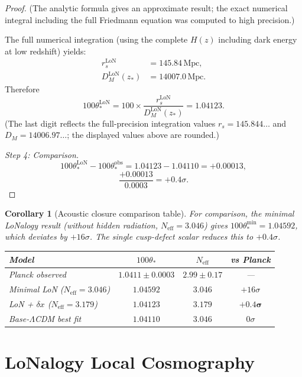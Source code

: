 \documentclass[12pt]{article}
\theoremstyle{plain}
\newtheorem{corollary}[theorem]{Corollary}
\theoremstyle{definition}
\numberwithin{equation}{section}
\newcommand{\eff}{\mathrm{eff}}
\newcommand{\obs}{\mathrm{obs}}
\newcommand{\LoN}{\mathrm{LoN}}
\begin{document}
\begin{proof}
(The analytic formula gives an approximate result; the exact numerical
integral including the full Friedmann equation was computed to high precision.)

The full numerical integration (using the complete $H(z)$ including dark
energy at low redshift) yields:
\begin{align}
r_s^{\LoN} &= 145.84\,\mathrm{Mpc},\\
D_M^{\LoN}(z_*) &= 14007.0\,\mathrm{Mpc}.
\end{align}
Therefore
\begin{equation}
100\theta_*^{\LoN} = 100\times\frac{r_s^{\LoN}}{D_M^{\LoN}(z_*)} = 1.04123.
\end{equation}
(The last digit reflects the full-precision integration values
$r_s=145.844\ldots$ and $D_M=14006.97\ldots$; the displayed values
above are rounded.)

\emph{Step 4: Comparison.}
\begin{equation}
100\theta_*^{\LoN}-100\theta_*^{\obs} = 1.04123-1.04110 = +0.00013,
\end{equation}
\begin{equation}
\frac{+0.00013}{0.0003} = +0.4\sigma.
\end{equation}
\end{proof}

\begin{corollary}[Acoustic closure comparison table]\label{cor:table}
For comparison, the minimal LoNalogy result (without hidden radiation,
$N_{\eff}=3.046$) gives $100\theta_*^{\mathrm{min}}=1.04592$,
which deviates by $+16\sigma$.  The single cusp-defect scalar reduces
this to $+0.4\sigma$.
\begin{center}
\begin{tabular}{lccc}
\toprule
Model & $100\theta_*$ & $N_{\eff}$ & vs Planck\\
\midrule
Planck observed & $1.0411\pm0.0003$ & $2.99\pm0.17$ & ---\\
Minimal LoN ($N_{\eff}=3.046$) & $1.04592$ & $3.046$ & $+16\sigma$\\
LoN + $\delta x$ ($N_{\eff}=3.179$) & $\mathbf{1.04123}$ & $3.179$ & $\mathbf{+0.4\sigma}$\\
Base-$\Lambda$CDM best fit & $1.04110$ & $3.046$ & $0\sigma$\\
\bottomrule
\end{tabular}
\end{center}
\end{corollary}


\section{LoNalogy Local Cosmography}\label{sec:local}
\end{document}
